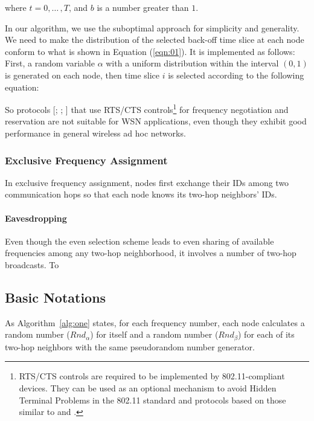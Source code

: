 \documentclass[prodmode,acmtecs]{acmsmall}
\begin{document}
where $t=0,{\ldots}\,,T$, and $b$ is a number greater than $1$.

In our algorithm, we use the suboptimal approach for simplicity and
generality. We need to make the distribution of the selected back-off
time slice at each node conform to what is shown in Equation
(\ref{eqn:01}). It is implemented as follows: First, a random
variable $\alpha$ with a uniform distribution within the interval
$(0, 1)$ is generated on each node, then time slice $i$ is selected
according to the following equation:

So protocols [;
; ] that use RTS/CTS
controls\footnote{RTS/CTS controls are required to be implemented by
802.11-compliant devices. They can be used as an optional mechanism
to avoid Hidden Terminal Problems in the 802.11 standard and
protocols based on those similar to  and
.} for frequency negotiation and reservation are not
suitable for WSN applications, even though they exhibit good
performance in general wireless ad hoc
networks.

\subsubsection{Exclusive Frequency Assignment}

In exclusive frequency assignment, nodes first exchange their IDs
among two communication hops so that each node knows its two-hop
neighbors' IDs. 

\paragraph{Eavesdropping}

Even though the even selection scheme leads to even sharing of
available frequencies among any two-hop neighborhood, it involves a
number of two-hop broadcasts. To 
\subsection{Basic Notations}

As Algorithm~\ref{alg:one} states, for each frequency
number, each node calculates a random number (${\textit{Rnd}}_{\alpha}$) for
itself and a random number (${\textit{Rnd}}_{\beta}$) for each of its two-hop
neighbors with the same pseudorandom number generator.
\end{document}
